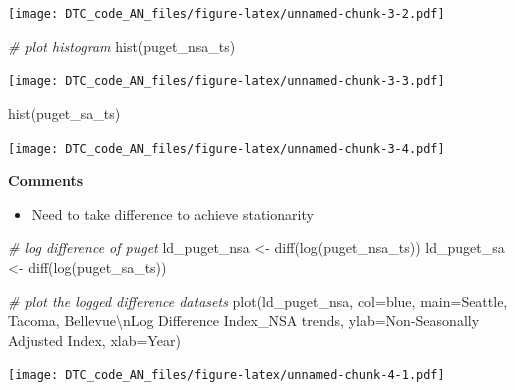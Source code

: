 \documentclass[
]{article}
\newenvironment{Shaded}{\begin{snugshade}}{\end{snugshade}}
\newcommand{\AttributeTok}[1]{\textcolor[rgb]{0.77,0.63,0.00}{#1}}
\newcommand{\CommentTok}[1]{\textcolor[rgb]{0.56,0.35,0.01}{\textit{#1}}}
\newcommand{\FunctionTok}[1]{\textcolor[rgb]{0.00,0.00,0.00}{#1}}
\newcommand{\NormalTok}[1]{#1}
\newcommand{\OtherTok}[1]{\textcolor[rgb]{0.56,0.35,0.01}{#1}}
\newcommand{\SpecialCharTok}[1]{\textcolor[rgb]{0.00,0.00,0.00}{#1}}
\newcommand{\StringTok}[1]{\textcolor[rgb]{0.31,0.60,0.02}{#1}}
\providecommand{\tightlist}{%
  \setlength{\itemsep}{0pt}\setlength{\parskip}{0pt}}
\begin{document}
\texttt{[image: DTC\_code\_AN\_files/figure-latex/unnamed-chunk-3-2.pdf]}

\begin{Shaded}
\begin{Highlighting}[]
\CommentTok{\# plot histogram}
\FunctionTok{hist}\NormalTok{(puget\_nsa\_ts)}
\end{Highlighting}
\end{Shaded}

\texttt{[image: DTC\_code\_AN\_files/figure-latex/unnamed-chunk-3-3.pdf]}

\begin{Shaded}
\begin{Highlighting}[]
\FunctionTok{hist}\NormalTok{(puget\_sa\_ts)}
\end{Highlighting}
\end{Shaded}

\texttt{[image: DTC\_code\_AN\_files/figure-latex/unnamed-chunk-3-4.pdf]}

\textbf{Comments}

\begin{itemize}
\tightlist
\item
  Need to take difference to achieve stationarity
\end{itemize}

\begin{Shaded}
\begin{Highlighting}[]
\CommentTok{\# log difference of puget}
\NormalTok{ld\_puget\_nsa }\OtherTok{\textless{}{-}} \FunctionTok{diff}\NormalTok{(}\FunctionTok{log}\NormalTok{(puget\_nsa\_ts))}
\NormalTok{ld\_puget\_sa }\OtherTok{\textless{}{-}} \FunctionTok{diff}\NormalTok{(}\FunctionTok{log}\NormalTok{(puget\_sa\_ts))}

\CommentTok{\# plot the logged difference datasets}
\FunctionTok{plot}\NormalTok{(ld\_puget\_nsa, }\AttributeTok{col=}\StringTok{\textquotesingle{}blue\textquotesingle{}}\NormalTok{, }\AttributeTok{main=}\StringTok{\textquotesingle{}Seattle, Tacoma, Bellevue}\SpecialCharTok{\textbackslash{}n}\StringTok{Log Difference Index\_NSA trends\textquotesingle{}}\NormalTok{, }\AttributeTok{ylab=}\StringTok{\textquotesingle{}Non{-}Seasonally Adjusted Index\textquotesingle{}}\NormalTok{, }\AttributeTok{xlab=}\StringTok{\textquotesingle{}Year\textquotesingle{}}\NormalTok{)}
\end{Highlighting}
\end{Shaded}

\texttt{[image: DTC\_code\_AN\_files/figure-latex/unnamed-chunk-4-1.pdf]}
\end{document}
